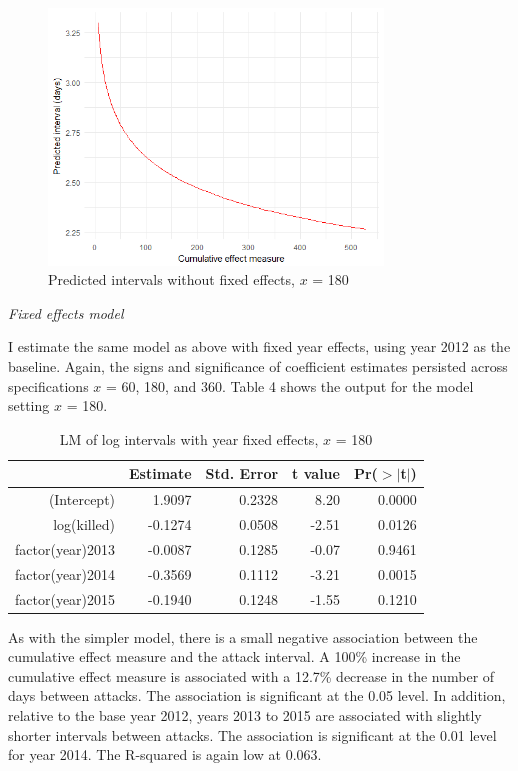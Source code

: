 \documentclass[letterpaper,12pt]{article}
\theoremstyle{definition}
\begin{document}
\begin{figure}[ht!]
\begin{center}
\caption {Predicted intervals without fixed effects, $x$ = 180}
  \includegraphics[width=3.5in]{pred_plot.png}
\end{center}
\end{figure}

\noindent\textit{Fixed effects model}

I estimate the same model as above with fixed year effects, using year 2012 as the baseline. Again, the signs and significance of coefficient estimates persisted across specifications  $x$ = 60, 180, and 360. Table 4 shows the output for the model setting $x$ = 180.

\begin{table}[htb!]
\centering
\caption {LM of log intervals with year fixed effects, $x$ = 180}
\begin{tabular}{rrrrr}
  \hline
&Estimate & Std. Error & t value & Pr($>$$|$t$|$) \\ 
  \hline
(Intercept) & 1.9097 & 0.2328 & 8.20 & 0.0000 \\ 
  log(killed) & -0.1274 & 0.0508 & -2.51 & 0.0126 \\ 
  factor(year)2013 & -0.0087 & 0.1285 & -0.07 & 0.9461 \\ 
  factor(year)2014 & -0.3569 & 0.1112 & -3.21 & 0.0015 \\ 
  factor(year)2015 & -0.1940 & 0.1248 & -1.55 & 0.1210 \\ 
   \hline
\end{tabular}
\end{table}

As with the simpler model, there is a small negative association between the cumulative effect measure and the attack interval. A 100\% increase in the cumulative effect measure is associated with a 12.7\% decrease in the number of days between attacks. The association is significant at the 0.05 level. In addition, relative to the base year 2012, years 2013 to 2015 are associated with slightly shorter intervals between attacks. The association is significant at the 0.01 level for year 2014. The R-squared is again low at 0.063.
\end{document}
